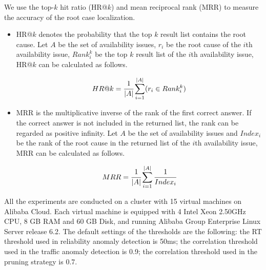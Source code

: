 We use the top-$k$ hit ratio (HR@$k$) and mean reciprocal rank (MRR) to measure the accuracy of the root case localization.
\begin{itemize}

	\item HR@$k$ denotes the probability that the top $k$ result list contains the root cause.
	Let $A$ be the set of availability issues, $r_i$ be the root cause of the $i$th availability issue, $Rank_{i}^{k}$ be the top $k$ result list of the $i$th availability issue, HR@$k$ can be calculated as follows.

	\begin{equation}
	HR@k = \cfrac{1}{|A|}\sum\limits_{i=1}^{|A|}(r_i \in Rank_{i}^{k})
	\end{equation}

	\item MRR is the multiplicative inverse of the rank of the first correct answer.	
	If the correct answer is not included in the returned list, the rank can be regarded as positive infinity.
	Let $A$ be the set of availability issues and $Index_i$ be the rank of the root cause in the returned list of the $i$th availability issue, MRR can be calculated as follows.
	
	\begin{equation}
	MRR = \cfrac{1}{|A|}\sum\limits_{i=1}^{|A|}\cfrac{1}{Index_i}
	\end{equation}
	
\end{itemize}

All the experiments are conducted on a cluster with 15 virtual machines on Alibaba Cloud.
Each virtual machine is equipped with 4 Intel Xeon 2.50GHz CPU, 8 GB RAM and 60 GB Disk, and running Alibaba Group Enterprise Linux Server release 6.2.
The default settings of the thresholds are the following:
the RT threshold used in reliability anomaly detection is 50ms;
the correlation threshold used in the traffic anomaly detection is 0.9;
the correlation threshold used in the pruning strategy is 0.7.
